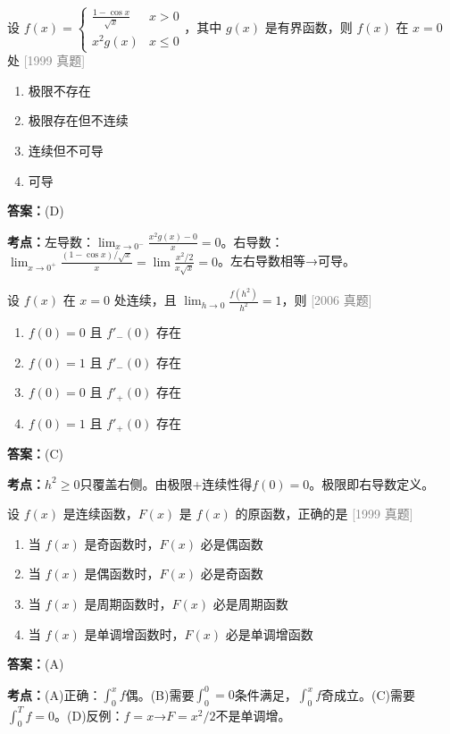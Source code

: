 \documentclass[12pt,a4paper]{ctexbook}
\newcommand{\src}[1]{\hfill\textcolor{gray}{\small\textsf{[#1]}}}
\newcommand{\ans}[1]{\begin{answerbox}\textbf{答案：}#1\end{answerbox}}
\newcommand{\kpt}[1]{\textbf{考点：}#1}
\begin{document}
\begin{exercise}
设 $f(x)=\begin{cases}\frac{1-\cos x}{\sqrt{x}} & x>0\\ x^2g(x) & x\leqslant 0\end{cases}$，其中 $g(x)$ 是有界函数，则 $f(x)$ 在 $x=0$ 处 \hfill\src{1999 真题}
\begin{enumerate}[label=(\Alph*),nosep]
  \item 极限不存在
  \item 极限存在但不连续
  \item 连续但不可导
  \item 可导
\end{enumerate}
\end{exercise}
\ans{(D)}
\kpt{左导数：$\lim_{x\to0^-}\frac{x^2g(x)-0}{x}=0$。右导数：$\lim_{x\to0^+}\frac{(1-\cos x)/\sqrt{x}}{x}=\lim\frac{x^2/2}{x\sqrt{x}}=0$。左右导数相等→可导。}

\bigskip

\begin{exercise}
设 $f(x)$ 在 $x=0$ 处连续，且 $\lim_{h\to 0}\frac{f(h^2)}{h^2}=1$，则 \hfill\src{2006 真题}
\begin{enumerate}[label=(\Alph*),nosep]
  \item $f(0)=0$ 且 $f'_-(0)$ 存在
  \item $f(0)=1$ 且 $f'_-(0)$ 存在
  \item $f(0)=0$ 且 $f'_+(0)$ 存在
  \item $f(0)=1$ 且 $f'_+(0)$ 存在
\end{enumerate}
\end{exercise}
\ans{(C)}
\kpt{$h^2\geqslant 0$只覆盖右侧。由极限+连续性得$f(0)=0$。极限即右导数定义。}

\bigskip

\begin{exercise}
设 $f(x)$ 是连续函数，$F(x)$ 是 $f(x)$ 的原函数，正确的是 \hfill\src{1999 真题}
\begin{enumerate}[label=(\Alph*),nosep]
  \item 当 $f(x)$ 是奇函数时，$F(x)$ 必是偶函数
  \item 当 $f(x)$ 是偶函数时，$F(x)$ 必是奇函数
  \item 当 $f(x)$ 是周期函数时，$F(x)$ 必是周期函数
  \item 当 $f(x)$ 是单调增函数时，$F(x)$ 必是单调增函数
\end{enumerate}
\end{exercise}
\ans{(A)}
\kpt{(A)正确：$\int_0^x f$偶。(B)需要$\int_0^0=0$条件满足，$\int_0^x f$奇成立。(C)需要$\int_0^T f=0$。(D)反例：$f=x$→$F=x^2/2$不是单调增。}
\end{document}
